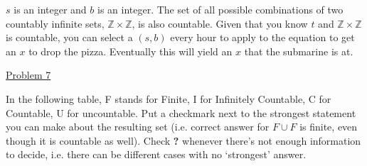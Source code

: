 \documentclass{article}
\begin{document}
$s$ is an integer and $b$ is an integer. The set of all possible combinations of two countably infinite sets, $\mathbb{Z}\times\mathbb{Z}$, is also countable. Given that you know $t$ and $\mathbb{Z}\times\mathbb{Z}$ is countable, you can select a $(s,b)$ every hour to apply to the equation to get an $x$ to drop the pizza. Eventually this will yield an $x$ that the submarine is at.

\underline{Problem 7} 

In the following table, F stands for Finite, I for Infinitely Countable, C for Countable, U for uncountable. Put a checkmark next
to the strongest statement you can make about the resulting set (i.e. correct answer for $F \cup F$ is finite, even though it is 
countable as well). Check \textbf{?} whenever there's not enough information to decide, i.e. there can be different cases with 
no `strongest' answer.

\bigskip
\end{document}
